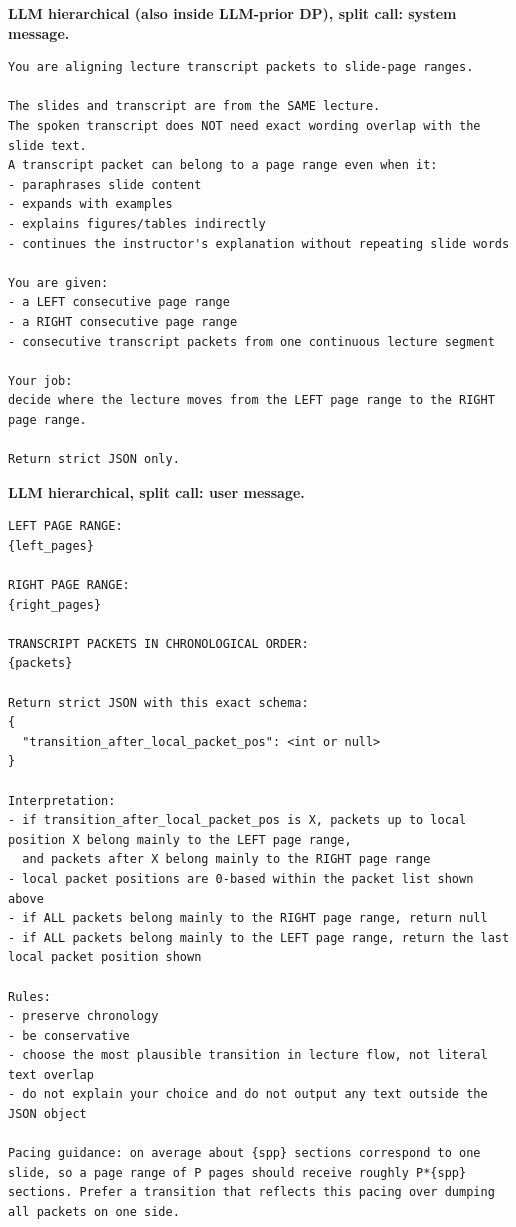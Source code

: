 \par\medskip\noindent\textbf{LLM hierarchical (also inside LLM-prior DP), split call: system message.}\par\nobreak
\begin{lstlisting}
You are aligning lecture transcript packets to slide-page ranges.

The slides and transcript are from the SAME lecture.
The spoken transcript does NOT need exact wording overlap with the slide text.
A transcript packet can belong to a page range even when it:
- paraphrases slide content
- expands with examples
- explains figures/tables indirectly
- continues the instructor's explanation without repeating slide words

You are given:
- a LEFT consecutive page range
- a RIGHT consecutive page range
- consecutive transcript packets from one continuous lecture segment

Your job:
decide where the lecture moves from the LEFT page range to the RIGHT page range.

Return strict JSON only.
\end{lstlisting}

\par\medskip\noindent\textbf{LLM hierarchical, split call: user message.}\par\nobreak
\begin{lstlisting}
LEFT PAGE RANGE:
{left_pages}

RIGHT PAGE RANGE:
{right_pages}

TRANSCRIPT PACKETS IN CHRONOLOGICAL ORDER:
{packets}

Return strict JSON with this exact schema:
{
  "transition_after_local_packet_pos": <int or null>
}

Interpretation:
- if transition_after_local_packet_pos is X, packets up to local position X belong mainly to the LEFT page range,
  and packets after X belong mainly to the RIGHT page range
- local packet positions are 0-based within the packet list shown above
- if ALL packets belong mainly to the RIGHT page range, return null
- if ALL packets belong mainly to the LEFT page range, return the last local packet position shown

Rules:
- preserve chronology
- be conservative
- choose the most plausible transition in lecture flow, not literal text overlap
- do not explain your choice and do not output any text outside the JSON object

Pacing guidance: on average about {spp} sections correspond to one slide, so a page range of P pages should receive roughly P*{spp} sections. Prefer a transition that reflects this pacing over dumping all packets on one side.
\end{lstlisting}

